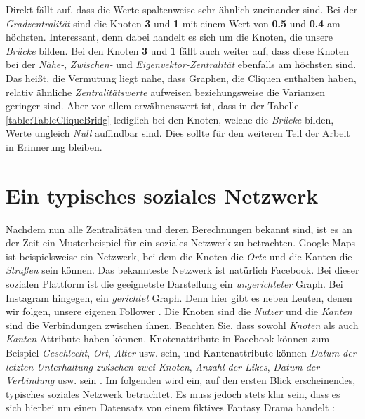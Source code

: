 Direkt fällt auf, dass die Werte spaltenweise sehr ähnlich zueinander sind. Bei der \textit{Gradzentralität} sind die Knoten \textbf{3} und \textbf{1} mit einem Wert von \textbf{0.5} und \textbf{0.4} am höchsten. Interessant, denn dabei handelt es sich um die Knoten, die unsere \textit{Brücke} bilden. Bei den Knoten \textbf{3} und \textbf{1} fällt auch weiter auf, dass diese Knoten bei der \textit{Nähe-}, \textit{Zwischen-} und \textit{Eigenvektor-Zentralität} ebenfalls am höchsten sind. Das heißt, die Vermutung liegt nahe, dass Graphen, die Cliquen enthalten haben, relativ ähnliche \textit{Zentralitätswerte} aufweisen beziehungsweise die Varianzen geringer sind. Aber vor allem erwähnenswert ist, dass in der Tabelle \ref{table:TableCliqueBridg} lediglich bei den Knoten, welche die \textit{Brücke} bilden, Werte ungleich \textit{Null} auffindbar sind. Dies sollte für den weiteren Teil der Arbeit in Erinnerung bleiben. 

\section{Ein typisches soziales Netzwerk}
Nachdem nun alle Zentralitäten und deren Berechnungen bekannt sind, ist es an der Zeit ein Musterbeispiel für ein soziales Netzwerk zu betrachten. Google Maps ist beispielsweise ein Netzwerk, bei dem die Knoten die \textit{Orte} und die Kanten die \textit{Straßen} sein können. Das bekannteste Netzwerk ist natürlich Facebook. Bei dieser sozialen Plattform ist die geeignetste Darstellung ein \textit{ungerichteter} Graph. Bei Instagram hingegen, ein \textit{gerichtet} Graph. Denn hier gibt es neben Leuten, denen wir folgen, unsere eigenen Follower \cite{fbInsta}. Die Knoten sind die \textit{Nutzer} und die \textit{Kanten} sind die Verbindungen zwischen ihnen. Beachten Sie, dass sowohl \textit{Knoten} als auch \textit{Kanten} Attribute haben können. Knotenattribute in Facebook können zum Beispiel \textit{Geschlecht}, \textit{Ort}, \textit{Alter} usw. sein, und Kantenattribute können \textit{Datum der letzten Unterhaltung zwischen zwei Knoten}, \textit{Anzahl der Likes}, \textit{Datum der Verbindung} usw. sein \cite{GOT}.
Im folgenden wird ein, auf den ersten Blick erscheinendes, typisches soziales Netzwerk betrachtet. Es muss jedoch stets klar sein, dass es sich hierbei um einen Datensatz von einem fiktives Fantasy Drama handelt \cite{GOT}:

